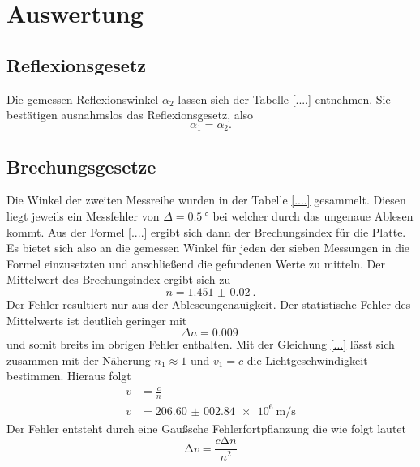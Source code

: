 \section{Auswertung}

\subsection{Reflexionsgesetz}
Die gemessen Reflexionswinkel $\alpha_2$ lassen sich der Tabelle \ref{....} entnehmen. Sie bestätigen ausnahmslos
das Reflexionsgesetz, also %
\begin{equation*}
    \alpha_1=\alpha_2.
\end{equation*}


\subsection{Brechungsgesetze}
\label{brechung}
Die Winkel der zweiten Messreihe wurden in der Tabelle \ref{....} gesammelt. Diesen liegt jeweils ein Messfehler von
$\Delta = \SI{0.5}{\degree}$ bei welcher durch das ungenaue Ablesen kommt. Aus der Formel \eqref{....} ergibt sich dann 
der Brechungsindex für die Platte. Es bietet sich also an die gemessen Winkel für jeden der sieben Messungen in die Formel einzusetzten 
und anschließend die gefundenen Werte zu mitteln. Der Mittelwert des Brechungsindex ergibt sich zu
\begin{equation}
    \bar{n} = \SI{1.451(0020)}{}.
\end{equation}
Der Fehler resultiert nur aus der Ableseungenauigkeit. Der statistische Fehler des Mittelwerts ist deutlich geringer mit
\begin{equation*}
    \Delta n = \SI{0.009}{}
\end{equation*}
und somit breits im obrigen Fehler enthalten. Mit der Gleichung \eqref{...} lässt sich zusammen mit der Näherung $n_1 \approx 1$
und $v_1 = c$ \cite{...} die Lichtgeschwindigkeit bestimmen. Hieraus folgt
\begin{align*}
    v &= \frac{c}{n} \\
    v &= \SI{206.60(00284)e6}{\meter\per\second}
\end{align*}
Der Fehler entsteht durch eine Gaußsche Fehlerfortpflanzung die wie folgt lautet
\begin{equation}
    \increment v = \frac{c \increment n}{n^2}
\end{equation}


